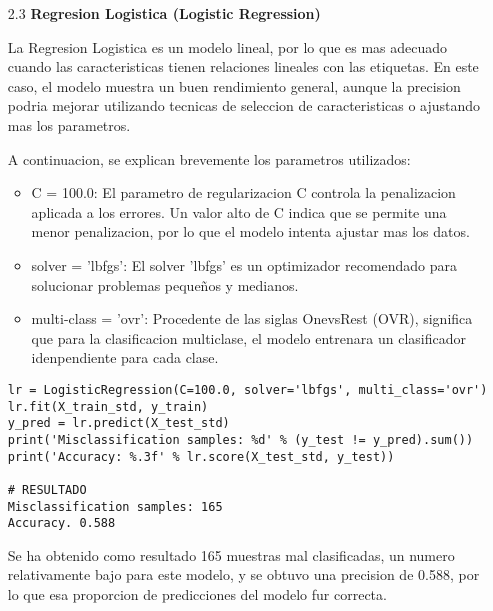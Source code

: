 \documentclass{article}
\begin{document}
\bigskip

\begin{itemize}

\item[2.3]  {\bf Regresion Logistica (Logistic Regression)}

La Regresion Logistica es un modelo lineal, por lo que es mas adecuado cuando las caracteristicas tienen relaciones lineales con las etiquetas. En este caso, el modelo muestra un buen rendimiento general, aunque la precision podria mejorar utilizando tecnicas de seleccion de caracteristicas o ajustando mas los parametros.

A continuacion, se explican brevemente los parametros utilizados:

\begin{itemize}

\item
C = 100.0: El parametro de regularizacion C controla la penalizacion aplicada a los errores. Un valor alto de C indica que se permite una menor penalizacion, por lo que el modelo intenta ajustar mas los datos.

\item
solver = 'lbfgs': El solver 'lbfgs' es un optimizador recomendado para solucionar problemas pequeños y medianos.

\item
multi-class = 'ovr': Procedente de las siglas OnevsRest (OVR), significa que para la
clasificacion multiclase, el modelo entrenara un clasificador idenpendiente para cada 
clase.

\end{itemize}

\begin{tcolorbox}[width=14cm]
\begin{scriptsize}
\begin{verbatim}
lr = LogisticRegression(C=100.0, solver='lbfgs', multi_class='ovr')
lr.fit(X_train_std, y_train)
y_pred = lr.predict(X_test_std)
print('Misclassification samples: %d' % (y_test != y_pred).sum())
print('Accuracy: %.3f' % lr.score(X_test_std, y_test))

# RESULTADO
Misclassification samples: 165
Accuracy. 0.588
\end{verbatim}
\end{scriptsize}
\end{tcolorbox}

Se ha obtenido como resultado 165 muestras mal clasificadas, un numero relativamente bajo para este modelo, y se obtuvo una precision de 0.588, por lo que esa proporcion de  predicciones del modelo fur correcta.

\end{itemize}
\end{document}
